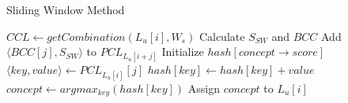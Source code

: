 
\begin{algorithm}[th]
\caption{Sliding Window Method}
\label{slide}
\begin{algorithmic}[1]
\State $CCL \leftarrow getCombination\left(L_u[i],W_s\right)$
\State Calculate $S_{SW}$ and $BCC$
\State Add $\langle BCC[j],S_{SW}\rangle$ to $PCL_{L_u[i+j]}$
\EndFor
\EndFor
{}
\State Initialize $hash[concept \rightarrow score]$
\State $\langle key,value\rangle \leftarrow PCL_{L_u[i]}[j]$
\State $hash[key] \leftarrow hash[key]+value$
\EndFor
\State $concept \leftarrow argmax_{key}\left(hash[key]\right)$
\State Assign $concept$ to $L_u[i]$
\EndIf
\EndFor
\EndProcedure
\end{algorithmic}
\end{algorithm}

